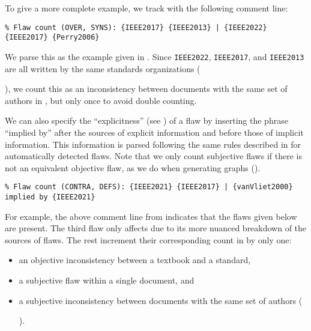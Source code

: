 To give a more complete example, we track  with the
following comment line:\utd{}
\begin{displayquote}
    \texttt{\% Flaw count (OVER, SYNS): \{IEEE2017\} \{IEEE2013\} | \{IEEE2022\}
        \displayNL{} \{IEEE2017\} \{Perry2006\}}
\end{displayquote}%
We parse this as the example given in . Since
\texttt{IEEE2022}, \texttt{IEEE2017}, and \texttt{IEEE2013} are all written by
the same standards
organizations (\begin{NoHyper}\citeauthor{IEEE2022}\end{NoHyper}), we count
this as an inconsistency between documents with the same set of authors in
, but only once to avoid double counting.

We can also specify the ``explicitness'' (see ) of a flaw by inserting
the phrase ``implied by'' after the sources of explicit information and before
those of implicit information. This information is parsed following the same
rules described in  for automatically
detected flaws. Note that we only count subjective flaws if there is not an
equivalent objective flaw, as we do when generating graphs ().
\begin{displayquote}
    \texttt{\% Flaw count (CONTRA, DEFS): \{IEEE2021\} \{IEEE2017\} |
        \displayNL \{vanVliet2000\} implied by \{IEEE2021\}}
\end{displayquote}
For example, the above comment line\utd{} from  indicates
that the flaws given below are present. The third flaw only affects
 due to its more nuanced breakdown of the
sources of flaws. The rest increment their corresponding count in
 by only one:
\begin{itemize}
    \item an objective inconsistency between a textbook and a standard,
    \item a subjective flaw within a single document, and
    \item a subjective inconsistency between documents with the same set of
          authors (\begin{NoHyper}\citeauthor{IEEE2022}\end{NoHyper}).
\end{itemize}


